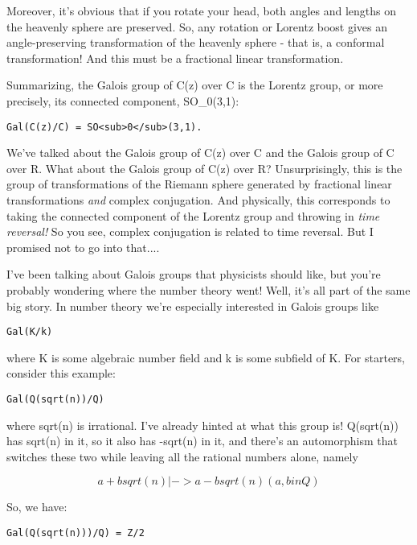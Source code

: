 Moreover, it's obvious that if you rotate your head, both angles and lengths
on the heavenly sphere are preserved.  So, any rotation or Lorentz boost 
gives an angle-preserving transformation of the heavenly sphere - that is, 
a conformal transformation!  And this must be a fractional linear 
transformation.

Summarizing, the Galois group of C(z) over C is the Lorentz group, or
more precisely, its connected component, SO_{0}(3,1):

\begin{verbatim}
Gal(C(z)/C) = SO<sub>0</sub>(3,1).
\end{verbatim}
    
We've talked about the Galois group of C(z) over C and the Galois group
of C over R.  What about the Galois group of C(z) over R?   Unsurprisingly,
this is the group of transformations of the Riemann sphere generated by 
fractional linear transformations \emph{and} 
complex conjugation.  And physically,
this corresponds to taking the connected component of the Lorentz group
and throwing in \emph{time reversal!}  
So you see, complex conjugation is related
to time reversal.  But I promised not to go into that....

I've been talking about Galois groups that physicists should like, but
you're probably wondering where the number theory went!  Well, it's 
all part of the same big story.  In number theory we're especially
interested in Galois groups like

\begin{verbatim}
Gal(K/k)
\end{verbatim}
    
where K is some algebraic number field and k is some subfield of K.
For starters, consider this example:

\begin{verbatim}
Gal(Q(sqrt(n))/Q)
\end{verbatim}
    
where sqrt(n) is irrational.  I've already hinted at what this group is!  
Q(sqrt(n)) has sqrt(n) in it, so it also has -sqrt(n) in it, and there's 
an automorphism that switches these two while leaving all the rational 
numbers alone, namely

$$
a + b sqrt(n) |-> a - b sqrt(n)                  (a,b in Q)
$$
    
So, we have:

\begin{verbatim}
Gal(Q(sqrt(n)))/Q) = Z/2
\end{verbatim}
    
